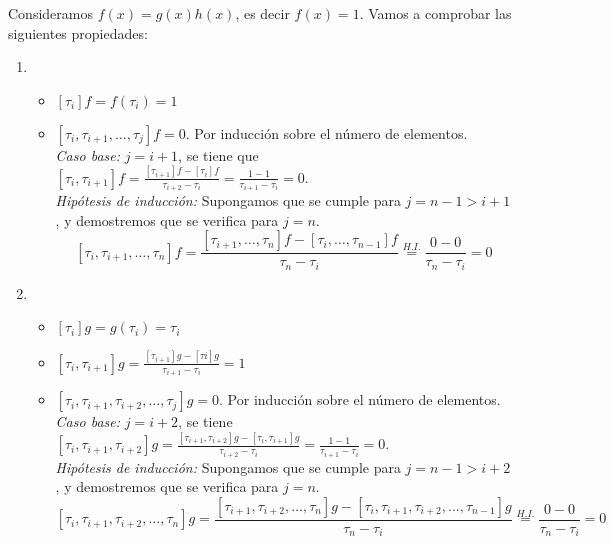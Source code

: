 \documentclass[12pt,a4paper]{article}
\begin{document}
Consideramos $f(x)=g(x)h(x)$, es decir $f(x)=1$. Vamos a comprobar las
siguientes propiedades:
\begin{enumerate}
\item 
  \begin{itemize}
  \item $[\tau_i]f=f(\tau_i)=1$
  \item $[\tau_i, \tau_{i+1}, \dots, \tau_j]f = 0$. Por inducción sobre el
    número de elementos.\\
    \textit{Caso base:} $j=i+1$, se tiene que $[\tau_i,\tau_{i+1}]f =
    \frac{[\tau_{i+1}]f -[\tau_i]f}{\tau_{i+2}-\tau_{i}} = \frac{1 -
      1}{\tau_{i+1} - \tau_i} = 0.$\\
    \textit{Hipótesis de inducción:} Supongamos que se cumple para $j=n-1>i+1$, y
    demostremos que se verifica para $j=n$.
    $$[\tau_i, \tau_{i+1},\dots,\tau_{n}] f =
    \frac{[\tau_{i+1},\dots,\tau_n]f -
      [\tau_i,\dots,\tau_{n-1}]f}{\tau_n-\tau_i} \stackrel{H.I.}{=} \frac{0-0}{\tau_n -
      \tau_i}=0$$
  \end{itemize}
\item 
  \begin{itemize}
  \item $[\tau_i]g=g(\tau_i)=\tau_i$
  \item $[\tau_i,\tau_{i+1}]g=\frac{[\tau_{i+1}]g-[\tau{i}]g}{\tau_{i+1}-\tau_{i}}=1$
  \item $[\tau_i, \tau_{i+1}, \tau_{i+2}, \dots, \tau_j]g = 0$. Por inducción sobre el
    número de elementos.\\
    \textit{Caso base:} $j=i+2$, se tiene $[\tau_i,\tau_{i+1},\tau_{i+2}]g =
    \frac{[\tau_{i+1},\tau_{i+2}]g -[\tau_i,\tau_{i+1}]g}{\tau_{i+2}-\tau_{i}} = \frac{1 -
      1}{\tau_{i+1} - \tau_i} = 0.$\\
    \textit{Hipótesis de inducción:} Supongamos que se cumple para $j=n-1>i+2$, y
    demostremos que se verifica para $j=n$.
    $$[\tau_i, \tau_{i+1}, \tau_{i+2},\dots,\tau_{n}] g =
    \frac{[\tau_{i+1}, \tau_{i+2},\dots,\tau_n]g -
      [\tau_i,\tau_{i+1},\tau_{i+2},\dots,\tau_{n-1}]g}{\tau_n-\tau_i} \stackrel{H.I.}{=} \frac{0-0}{\tau_n -
      \tau_i}=0$$
  \end{itemize}
\end{enumerate}
\end{document}
